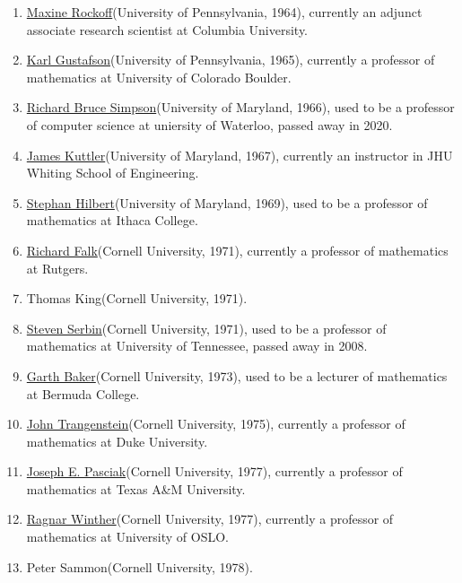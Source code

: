 \begin{enumerate}
\item \href{https://www.linkedin.com/in/maxine-rockoff-394b114/}{Maxine Rockoff}(University of Pennsylvania, 1964), currently an adjunct associate research scientist at Columbia University.
\item \href{http://euclid.colorado.edu/~gustafs/}{Karl Gustafson}(University of Pennsylvania, 1965), currently a professor of mathematics at University of Colorado Boulder.
\item \href{https://cs.uwaterloo.ca/~rbsimpso/RBScv.pdf}{Richard Bruce Simpson}(University of Maryland, 1966), used to be a professor of computer science at uniersity of Waterloo, passed away in 2020.
\item \href{https://ep.jhu.edu/faculty/james-kuttler/}{James Kuttler}(University of Maryland, 1967), currently an instructor in JHU Whiting School of Engineering.
\item \href{https://en.wikipedia.org/wiki/Stephen_Hilbert}{Stephan Hilbert}(University of Maryland, 1969), used to be a professor of mathematics at Ithaca College.
\item \href{https://sites.math.rutgers.edu/~falk/}{Richard Falk}(Cornell University, 1971), currently a professor of mathematics at Rutgers.
\item Thomas King(Cornell University, 1971).
\item \href{https://www.legacy.com/us/obituaries/knoxnews/name/steven-serbin-obituary?pid=120620923}{Steven Serbin}(Cornell University, 1971), used to be a professor of mathematics at University of Tennessee, passed away in 2008.
\item \href{http://www.math.buffalo.edu/mad/PEEPS/baker_gartha.html}{Garth Baker}(Cornell University, 1973), used to be a lecturer of mathematics at Bermuda College.
\item \href{https://services.math.duke.edu/~johnt/}{John Trangenstein}(Cornell University, 1975), currently a professor of mathematics at Duke University.
\item \href{https://www.math.tamu.edu/~joe.pasciak/}{Joseph E. Pasciak}(Cornell University, 1977), currently a professor of mathematics at Texas A\&M University.
\item \href{https://www.mn.uio.no/math/english/people/aca/rwinther/}{Ragnar Winther}(Cornell University, 1977), currently a professor of mathematics at University of OSLO.
\item Peter Sammon(Cornell University, 1978).

\end{enumerate}
